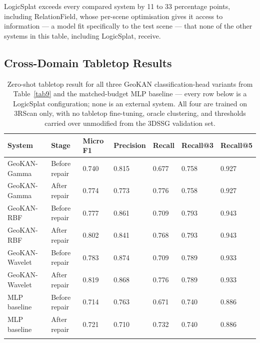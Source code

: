 \documentclass[sn-mathphys,Numbered]{sn-jnl}
\begin{document}
LogicSplat exceeds every compared system by 11 to 33 percentage points, including RelationField, whose per-scene optimisation gives it access to information --- a model fit specifically to the test scene --- that none of the other systems in this table, including LogicSplat, receive.

\FloatBarrier
\subsection{Cross-Domain Tabletop Results}\label{subsec5-2}

\begin{table}[htbp]
\centering
\caption{Zero-shot tabletop result for all three GeoKAN classification-head variants from Table~\ref{tab9} and the matched-budget MLP baseline --- every row below is a LogicSplat configuration; none is an external system. All four are trained on 3RScan only, with no tabletop fine-tuning, oracle clustering, and thresholds carried over unmodified from the 3DSSG validation set.}\label{tab11}
\small
\begin{tabular}{@{}p{1.6cm}p{1.5cm}p{1.1cm}p{1.2cm}p{1cm}p{1.2cm}p{1.2cm}@{}}
\toprule
System & Stage & Micro F1 & Precision & Recall & Recall@3 & Recall@5 \\
\midrule
GeoKAN-Gamma & Before repair & 0.740 & 0.815 & 0.677 & 0.758 & 0.927 \\
\midrule
GeoKAN-Gamma & After repair & 0.774 & 0.773 & 0.776 & 0.758 & 0.927 \\
\midrule
GeoKAN-RBF & Before repair & 0.777 & 0.861 & 0.709 & 0.793 & 0.943 \\
\midrule
GeoKAN-RBF & After repair & 0.802 & 0.841 & 0.768 & 0.793 & 0.943 \\
\midrule
GeoKAN-Wavelet & Before repair & 0.783 & 0.874 & 0.709 & 0.789 & 0.933 \\
\midrule
GeoKAN-Wavelet & After repair & 0.819 & 0.868 & 0.776 & 0.789 & 0.933 \\
\midrule
MLP baseline & Before repair & 0.714 & 0.763 & 0.671 & 0.740 & 0.886 \\
\midrule
MLP baseline & After repair & 0.721 & 0.710 & 0.732 & 0.740 & 0.886 \\
\botrule
\end{tabular}
\end{table}
\end{document}
